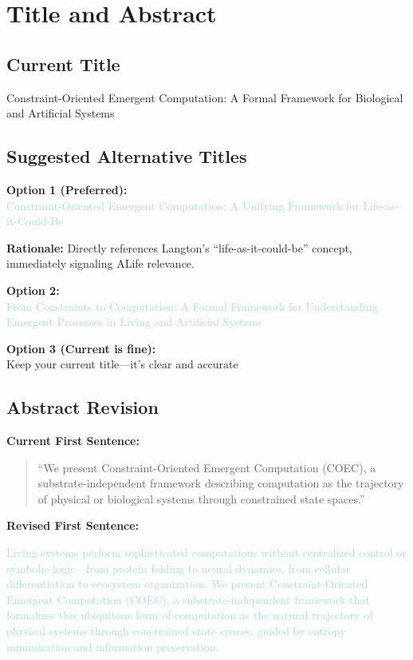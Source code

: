 \documentclass[11pt]{article}
\begin{document}
\section{Title and Abstract} \label{sec:abstract}

\subsection{Current Title}
\textcolor{edit}{Constraint-Oriented Emergent Computation: A Formal Framework for Biological and Artificial Systems}

\subsection{Suggested Alternative Titles}

\textbf{Option 1 (Preferred):}\\
\textcolor{add}{Constraint-Oriented Emergent Computation: A Unifying Framework for Life-as-it-Could-Be}

\textbf{Rationale:} Directly references Langton's ``life-as-it-could-be'' concept, immediately signaling ALife relevance.

\textbf{Option 2:}\\
\textcolor{add}{From Constraints to Computation: A Formal Framework for Understanding Emergent Processes in Living and Artificial Systems}

\textbf{Option 3 (Current is fine):}\\
\textcolor{keep}{Keep your current title—it's clear and accurate}

\subsection{Abstract Revision}

\textbf{Current First Sentence:}
\begin{quote}
``We present Constraint-Oriented Emergent Computation (COEC), a substrate-independent framework describing computation as the trajectory of physical or biological systems through constrained state spaces.''
\end{quote}

\textbf{Revised First Sentence:}
\begin{tcolorbox}[colback=add!10,colframe=add]
\textcolor{add}{Living systems perform sophisticated computations without centralized control or symbolic logic—from protein folding to neural dynamics, from cellular differentiation to ecosystem organization. We present Constraint-Oriented Emergent Computation (COEC), a substrate-independent framework that formalizes this ubiquitous form of computation as the natural trajectory of physical systems through constrained state spaces, guided by entropy minimization and information preservation.}
\end{tcolorbox}
\end{document}
